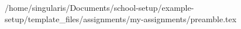 /home/singularis/Documents/school-setup/example-setup/template_files/assignments/my-assignments/preamble.tex